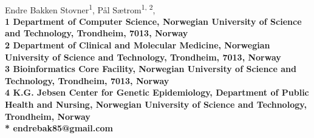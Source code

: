 \documentclass[10pt,letterpaper]{article}
\begin{document}
\vspace*{0.35in}

\begin{flushleft}
{\Large
  \textbf{}
}
\newline
\\
Endre Bakken Stovner\textsuperscript{1},
Pål Sætrom\textsuperscript{1, 2},
\\
\bf{1} Department of
  Computer Science, Norwegian University
  of Science and Technology, Trondheim, 7013, Norway
\\
\bf{2} Department of Clinical and Molecular Medicine, Norwegian
  University of Science and Technology, Trondheim, 7013, Norway
\\
\bf{3} Bioinformatics Core Facility, Norwegian University of Science and
Technology, Trondheim, 7013, Norway
\\
\bf{4} K.G. Jebsen Center for Genetic Epidemiology, Department of Public Health
and Nursing, Norwegian University of Science and Technology, Trondheim, Norway
\\
\bigskip
* endrebak85@gmail.com

\end{flushleft}



\end{document}
